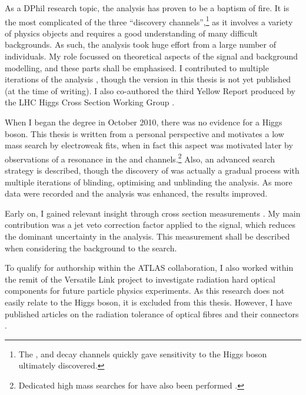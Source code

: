 
As a DPhil research topic, the \HWW analysis has proven to be a baptism of fire. It is the 
most complicated of the three ``discovery channels'',\footnote{
	The \HepProcess{\Pphoton\Pphoton}, \ZZ and \WW decay channels quickly gave sensitivity 
	to the Higgs boson ultimately discovered.
}
as it involves a variety of physics objects and requires a good understanding of many 
difficult backgrounds. As such, the analysis took huge effort from a large number of 
individuals. My role focussed on theoretical aspects of the signal and background 
modelling, and these parts shall be emphasised. I contributed to multiple iterations of 
the analysis \cite{ATLAS-discovery,HWW-HCP,HWW-Moriond}, though the version in this thesis 
is not yet published (at the time of writing). I also co-authored the third Yellow Report 
produced by the LHC Higgs Cross Section Working Group \cite{YR3}.

When I began the degree in October 2010, there was no evidence for a Higgs boson. This 
thesis is written from a personal perspective and motivates a low mass search by 
electroweak fits, when in fact this aspect was motivated later by observations of a 
resonance in the \HepProcess{\Pphoton\Pphoton} and \ZZ channels.\footnote{
	Dedicated high mass searches for \HWW have also been performed \cite{HWW-highmass}.
}
Also, an advanced search strategy is described, though the discovery of \HWW was actually 
a gradual process with multiple iterations of blinding, optimising and unblinding the 
analysis. As more data were recorded and the analysis was enhanced, the results improved.

Early on, I gained relevant insight through \WW cross section measurements 
\cite{WW-1ifb,WW-HCP,WW-7TeV}. My main contribution was a jet veto correction factor 
applied to the \WW signal, which reduces the dominant uncertainty in the analysis. This 
measurement shall be described when considering the \WW background to the \HWW search.

To qualify for authorship within the ATLAS collaboration, I also worked within the remit 
of the Versatile Link project \cite{VersatileLink} to investigate radiation hard optical 
components for future particle physics experiments. As this research does not easily 
relate to the Higgs boson, it is excluded from this thesis. However, I have published 
articles on the radiation tolerance of optical fibres \cite{VersatileLinkFibres} and their 
connectors \cite{VersatileLinkConnectors}.
